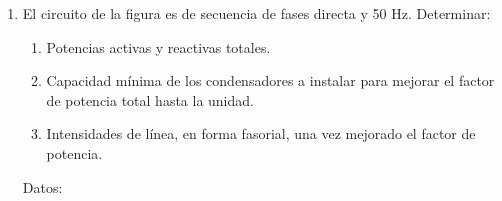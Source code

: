 \begin{enumerate}
  Una vez conectados los condensadores del último apartado:
  \begin{enumerate}[resume]
  \item Calcule el \textbf{valor eficaz} de la corriente de línea
    total.
  \item Calcule el triángulo de potencias a la entrada de la línea.
  \item Calcule el \textbf{valor eficaz} de la tensión a la entrada de
    la línea.
  \item Determine la lectura de los vatímetros descritos
    anteriormente.
  \end{enumerate}
  \emph{Sol.:
    $P_1 = {30}{kW};\; Q_1 = {24.07}{kVAr};\; S_1={38.46}{kVA};\; P_2
    = {7.5}{kW};\; Q_2 = {8.31}{kVAr};\; S_2 ={11.19}{kVA}; P_T=
    {37.5}{kW}; \;Q_T= {32.38}{kVAr};\; S_T = {49.55}{kVA};\; I_1 =
    {55.51}{A};\; I_2 = {16.15}{A};\; I_T= {71.52}{A};\; W_{A,AC} =
    {28.10}{kW}; \; W_{B,BC} = {9.40}{kW};\;W_{C, BA} =-
    {18.69}{kW};\; P_g = {39.74}{kW};\; Q_g= {32.38}{kVAr};\; S_g =
    {51.26}{kVA};\;U_g = {413.81}{V};\; C = {214.7}{\mu F/fase};\;
    I_T' = {54.13}{A};\; P_g' = {38.78}{kW};\; Q_g' = {0}{VAr};\; S_g'
    ={38.78}{kVA};\; U' = {413.66}{V};\; W_{A,AC}' = {18.75}{kW};\;
    W_{B,BC}' = {18.75}{kW};\; W'_{C,BA} = {0}{W}$ }
 
\item El circuito de la figura es de secuencia de fases directa y 50
  Hz. Determinar:
  \begin{enumerate}
  \item Potencias activas y reactivas totales.
  \item Capacidad mínima de los condensadores a instalar para mejorar
    el factor de potencia total hasta la unidad.
  \item Intensidades de línea, en forma fasorial, una vez mejorado el
    factor de potencia.
  \end{enumerate}
  \begin{minipage}{0.4\linewidth}
    Datos:


\end{minipage}
\end{enumerate}
